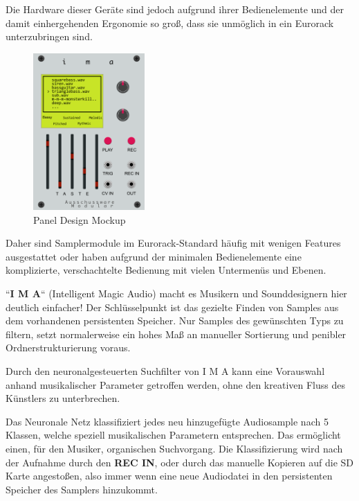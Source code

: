 	Die Hardware dieser Geräte sind jedoch aufgrund ihrer Bedienelemente und der damit einhergehenden Ergonomie so groß, dass sie unmöglich in ein Eurorack unterzubringen sind.
	
	\begin{figure} %
		\vspace{-20pt + 0.02\textwidth}
		\hspace{0.02\textwidth} %
		\includegraphics[width=0.38\textwidth]{images/02_detaillierte-projektbeschr/ima_mockup.png} %
		\caption{Panel Design Mockup }
		\label{fig:panel_mockup}
		\vspace{-20pt}
	\end{figure}

	Daher sind Samplermodule im Eurorack-Standard häufig mit wenigen Features ausgestattet oder haben aufgrund der minimalen Bedienelemente eine komplizierte, verschachtelte Bedienung mit vielen Untermenüs und Ebenen. 
	
	``\textbf{I M A}`` (Intelligent Magic Audio) macht es Musikern und Sounddesignern hier deutlich einfacher! Der Schlüsselpunkt ist das gezielte Finden von Samples aus dem vorhandenen persistenten Speicher. Nur Samples des gewünschten Typs zu filtern, setzt normalerweise ein hohes Maß an manueller Sortierung und penibler Ordnerstrukturierung voraus.
	
	Durch den neuronalgesteuerten Suchfilter von I M A kann eine Vorauswahl anhand musikalischer Parameter getroffen werden, ohne den kreativen Fluss des Künstlers zu unterbrechen.
	
	Das Neuronale Netz klassifiziert jedes neu hinzugefügte Audiosample nach 5 Klassen, welche speziell musikalischen Parametern entsprechen. Das ermöglicht einen, für den Musiker, organischen Suchvorgang.
	Die Klassifizierung wird nach der Aufnahme durch den \textbf{REC IN}, oder durch das manuelle Kopieren auf die SD Karte angestoßen, also immer wenn eine neue Audiodatei in den persistenten Speicher des Samplers hinzukommt.
	
